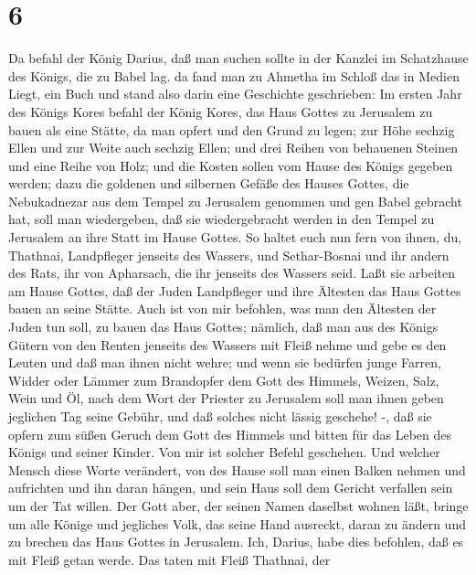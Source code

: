 \hypertarget{section-5}{%
\section{6}\label{section-5}}

 Da befahl der König Darius, daß man suchen sollte in der
Kanzlei im Schatzhause des Königs, die zu Babel lag.  da
fand man zu Ahmetha im Schloß das in Medien Liegt, ein Buch und stand
also darin eine Geschichte geschrieben:  Im ersten Jahr des
Königs Kores befahl der König Kores, das Haus Gottes zu Jerusalem zu
bauen als eine Stätte, da man opfert und den Grund zu legen; zur Höhe
sechzig Ellen und zur Weite auch sechzig Ellen;  und drei
Reihen von behauenen Steinen und eine Reihe von Holz; und die Kosten
sollen vom Hause des Königs gegeben werden;  dazu die
goldenen und silbernen Gefäße des Hauses Gottes, die Nebukadnezar aus
dem Tempel zu Jerusalem genommen und gen Babel gebracht hat, soll man
wiedergeben, daß sie wiedergebracht werden in den Tempel zu Jerusalem an
ihre Statt im Hause Gottes.  So haltet euch nun fern von
ihnen, du, Thathnai, Landpfleger jenseits des Wassers, und Sethar-Bosnai
und ihr andern des Rats, ihr von Apharsach, die ihr jenseits des Wassers
seid.  Laßt sie arbeiten am Hause Gottes, daß der Juden
Landpfleger und ihre Ältesten das Haus Gottes bauen an seine Stätte.
 Auch ist von mir befohlen, was man den Ältesten der Juden
tun soll, zu bauen das Haus Gottes; nämlich, daß man aus des Königs
Gütern von den Renten jenseits des Wassers mit Fleiß nehme und gebe es
den Leuten und daß man ihnen nicht wehre;  und wenn sie
bedürfen junge Farren, Widder oder Lämmer zum Brandopfer dem Gott des
Himmels, Weizen, Salz, Wein und Öl, nach dem Wort der Priester zu
Jerusalem soll man ihnen geben jeglichen Tag seine Gebühr, und daß
solches nicht lässig geschehe! -,  daß sie opfern zum süßen
Geruch dem Gott des Himmels und bitten für das Leben des Königs und
seiner Kinder.  Von mir ist solcher Befehl geschehen. Und
welcher Mensch diese Worte verändert, von des Hause soll man einen
Balken nehmen und aufrichten und ihn daran hängen, und sein Haus soll
dem Gericht verfallen sein um der Tat willen.  Der Gott
aber, der seinen Namen daselbst wohnen läßt, bringe um alle Könige und
jegliches Volk, das seine Hand ausreckt, daran zu ändern und zu brechen
das Haus Gottes in Jerusalem. Ich, Darius, habe dies befohlen, daß es
mit Fleiß getan werde.  Das taten mit Fleiß Thathnai, der
